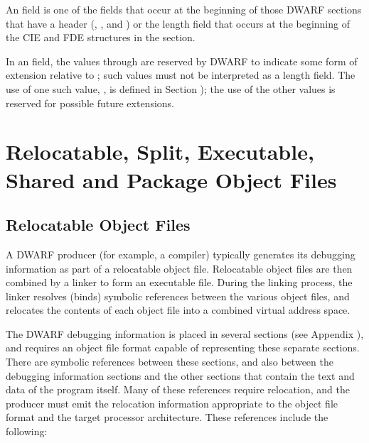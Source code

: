 An  field 
is one of the fields that occur at the beginning 
of those DWARF sections that have a header
(\dotdebugaranges{}, 
\dotdebuginfo{}, 
\dotdebugline{} and
\dotdebugnames{}) or the length field
that occurs at the beginning of the CIE and FDE structures
in the \dotdebugframe{} section.

In an  field, the values \wfffffffzero through
\wffffffff are reserved by DWARF to indicate some form of
extension relative to \DWARFVersionII; such values must not
be interpreted as a length field. The use of one such value,
\xffffffff, is defined 
\bb
in
\eb
Section ); 
the use of
the other values is reserved for possible future extensions.



\section{Relocatable, Split, Executable, Shared and Package Object Files} 
\label{datarep:executableobjectsandsharedobjects}

\subsection{Relocatable Object Files}
\label{datarep:relocatableobjectfiles}
A DWARF producer (for example, a compiler) typically generates its
debugging information as part of a relocatable object file.
Relocatable object files are then combined by a linker to form an
executable file. During the linking process, the linker resolves
(binds) symbolic references between the various object files, and
relocates the contents of each object file into a combined virtual
address space.

The DWARF debugging information is placed in several sections (see
Appendix ), and 
requires an object file format capable of
representing these separate sections. There are symbolic references
between these sections, and also between the debugging information
sections and the other sections that contain the text and data of the
program itself. Many of these references require relocation, and the
producer must emit the relocation information appropriate to the
object file format and the target processor architecture. These
references include the following:

